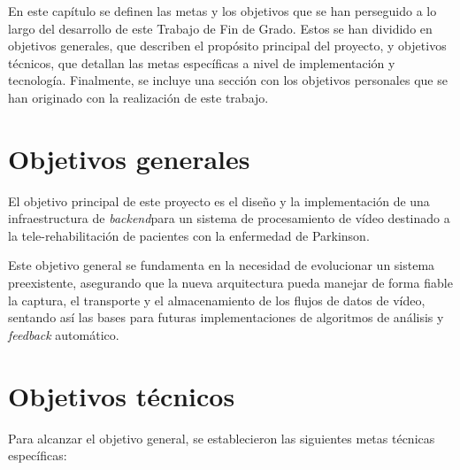 
En este capítulo se definen las metas y los objetivos que se han perseguido a lo largo del desarrollo de este Trabajo de Fin de Grado. Estos se han dividido en objetivos generales, que describen el propósito principal del proyecto, y objetivos técnicos, que detallan las metas específicas a nivel de implementación y tecnología. Finalmente, se incluye una sección con los objetivos personales que se han originado con la realización de este trabajo.

\section{Objetivos generales}

El objetivo principal de este proyecto es el diseño y la implementación de una infraestructura de \textit{backend}para un sistema de procesamiento de vídeo destinado a la tele-rehabilitación de pacientes con la enfermedad de Parkinson.

Este objetivo general se fundamenta en la necesidad de evolucionar un sistema preexistente, asegurando que la nueva arquitectura pueda manejar de forma fiable la captura, el transporte y el almacenamiento de los flujos de datos de vídeo, sentando así las bases para futuras implementaciones de algoritmos de análisis y \textit{feedback} automático.

\section{Objetivos técnicos}

Para alcanzar el objetivo general, se establecieron las siguientes metas técnicas específicas:

